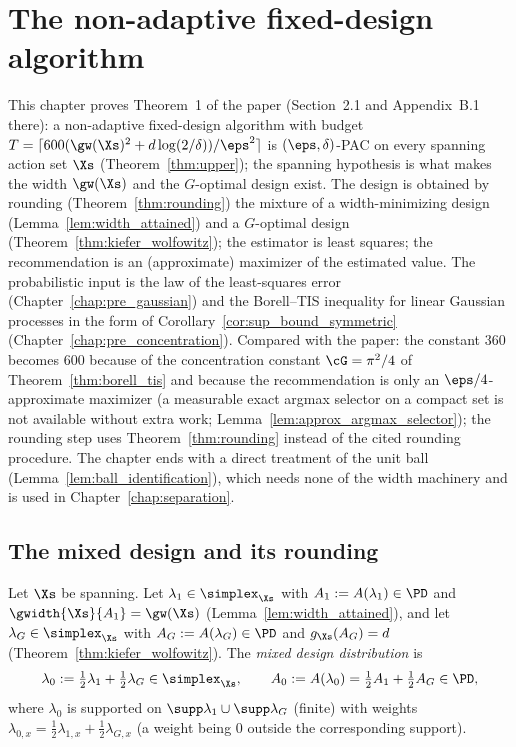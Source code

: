 \chapter{The non-adaptive fixed-design algorithm}
\label{chap:upper}

This chapter proves Theorem~1 of the paper (Section~2.1 and Appendix~B.1 there): a
non-adaptive fixed-design algorithm with budget
$T = \lceil 600(\gw(\Xs)^2 + d\log(2/\delta))/\eps^2\rceil$ is $(\eps,\delta)$-PAC on every
spanning action set $\Xs$ (Theorem~\ref{thm:upper}); the spanning hypothesis is what makes the
width $\gw(\Xs)$ and the $G$-optimal design exist. The design is obtained by rounding
(Theorem~\ref{thm:rounding}) the mixture of a width-minimizing design
(Lemma~\ref{lem:width_attained}) and a $G$-optimal design (Theorem~\ref{thm:kiefer_wolfowitz});
the estimator is least squares; the recommendation is an (approximate) maximizer of the
estimated value. The probabilistic input is the law of the least-squares error
(Chapter~\ref{chap:pre_gaussian}) and the Borell--TIS inequality for linear Gaussian processes in
the form of Corollary~\ref{cor:sup_bound_symmetric} (Chapter~\ref{chap:pre_concentration}).
Compared with the paper: the constant $360$ becomes $600$ because of the concentration
constant $\cG = \pi^2/4$ of Theorem~\ref{thm:borell_tis} and because the recommendation is only
an $\eps/4$-approximate maximizer (a measurable exact argmax selector on a compact set is not
available without extra work; Lemma~\ref{lem:approx_argmax_selector}); the rounding step uses
Theorem~\ref{thm:rounding} instead of the cited rounding procedure. The chapter ends with a
direct treatment of the unit ball (Lemma~\ref{lem:ball_identification}), which needs none of
the width machinery and is used in Chapter~\ref{chap:separation}.

\section{The mixed design and its rounding}
\label{sec:upper_design}

\begin{definition}\label{def:mixed_design}
\leanok
{}
Let $\Xs$ be spanning. Let $\lambda_1 \in \simplex_{\Xs}$ with $A_1 := A(\lambda_1) \in \PD$ and
$\gwidth{\Xs}{A_1} = \gw(\Xs)$ (Lemma~\ref{lem:width_attained}), and let $\lambda_G \in \simplex_{\Xs}$
with $A_G := A(\lambda_G) \in \PD$ and $g_{\Xs}(A_G) = d$ (Theorem~\ref{thm:kiefer_wolfowitz}). The
\emph{mixed design distribution} is
\[
  \lambda_0 := \tfrac12\lambda_1 + \tfrac12\lambda_G \in \simplex_{\Xs},
  \qquad
  A_0 := A(\lambda_0) = \tfrac12A_1 + \tfrac12A_G \in \PD ,
\]
where $\lambda_0$ is supported on $\supp\lambda_1\cup\supp\lambda_G$ (finite) with weights
$\lambda_{0,x} = \frac12\lambda_{1,x} + \frac12\lambda_{G,x}$ (a weight being $0$ outside the
corresponding support).
\end{definition}


